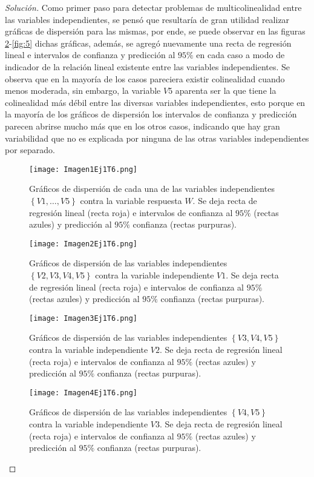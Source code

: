 \documentclass[10.5pt,notitlepage]{article}
\newenvironment{solucion}
  {\begin{proof}[Solución]}
  {\end{proof}}
\newcommand{\kis}[1]{\left\{ #1 \right\}}
\theoremstyle{plain}
\begin{document}
\begin{solucion}
Como primer paso para detectar problemas de multicolinealidad entre las variables independientes, se pensó que resultaría de gran utilidad realizar gráficas de dispersión para las mismas, por ende, se puede observar en las figuras \ref{fig:2}-\ref{fig:5} dichas gráficas, además, se agregó nuevamente una recta de regresión lineal e intervalos de confianza y predicción al \(95\%\) en cada caso a modo de indicador de la relación lineal existente entre las variables independientes. Se observa que en la mayoría de los casos pareciera existir colinealidad cuando menos moderada, sin embargo, la variable \(V5\) aparenta ser la que tiene la colinealidad más débil entre las diversas variables independientes, esto porque en la mayoría de los gráficos de dispersión los intervalos de confianza y predicción parecen abrirse mucho más que en los otros casos, indicando que hay gran variabilidad que no es explicada por ninguna de las otras variables independientes por separado. \\
\begin{figure}[htb]
 \centering
 \texttt{[image: Imagen1Ej1T6.png]}
 \caption{Gráficos de dispersión de cada una de las variables independientes \(\kis{V1,\hdots,V5}\) contra la variable respuesta \(W\). Se deja recta de regresión lineal (recta roja) e intervalos de confianza al \(95\%\) (rectas azules) y predicción al \(95\%\) confianza (rectas purpuras).}
\label{fig:1}
\end{figure}
\begin{figure}[htb]
 \centering
 \texttt{[image: Imagen2Ej1T6.png]}
 \caption{Gráficos de dispersión de las variables independientes \(\kis{V2,V3,V4,V5}\) contra la variable independiente \(V1\). Se deja recta de regresión lineal (recta roja) e intervalos de confianza al \(95\%\) (rectas azules) y predicción al \(95\%\) confianza (rectas purpuras).}
\label{fig:2}
\end{figure}
\begin{figure}[htb]
 \centering
 \texttt{[image: Imagen3Ej1T6.png]}
 \caption{Gráficos de dispersión de las variables independientes \(\kis{V3,V4,V5}\) contra la variable independiente \(V2\). Se deja recta de regresión lineal (recta roja) e intervalos de confianza al \(95\%\) (rectas azules) y predicción al \(95\%\) confianza (rectas purpuras).}
\label{fig:3}
\end{figure}
\begin{figure}[htb]
 \centering
 \texttt{[image: Imagen4Ej1T6.png]}
 \caption{Gráficos de dispersión de las variables independientes \(\kis{V4,V5}\) contra la variable independiente \(V3\). Se deja recta de regresión lineal (recta roja) e intervalos de confianza al \(95\%\) (rectas azules) y predicción al \(95\%\) confianza (rectas purpuras).}

\end{figure}
\end{solucion}
\end{document}
